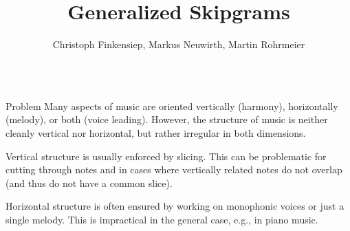 \documentclass[final,cmyk]{beamer}
\title{Generalized Skipgrams}
\author{Christoph Finkensiep, Markus Neuwirth, Martin Rohrmeier}
\institute{Digital and Cognitive Musicology Lab, École Polytechnique Fédérale de Lausanne}
\newcommand*{\pianoroll}{
  \draw (0,2) rectangle (1,2.4);
  \draw (1,2.4) rectangle (2,2.8);
  \draw (2,2) rectangle (2.5,2.4);
  \draw (2.5,1.6) rectangle (3,2);
  \draw (3,1.2) rectangle (3.5,1.6);
  \draw (3.5,0.8) rectangle (4,1.2);
  
  \draw (4,1.6) rectangle (5,2);
  \draw (5,2) rectangle (6,2.4);
  \draw (6,1.6) rectangle (6.5,2);
  \draw (6.5,1.2) rectangle (7,1.6);
  \draw (7,0.8) rectangle (7.5,1.2);
  \draw (7.5,0.4) rectangle (8,0.8);
  
  \draw (1,-0.4) rectangle (2,0);
  \draw (2,0) rectangle (4,0.4);
  \draw (5,-0.8) rectangle (6,-0.4);
  \draw (6,-0.4) rectangle (8,0);
}
\begin{document}
\begin{frame}[t]

  \begin{columns}[t]
    \begin{column}{0.3\textwidth}
      \begin{block}{Problem}
        Many aspects of music are oriented \alert{vertically}
        (harmony), \alert{horizontally} (melody), or both (voice
        leading).  However, the structure of music is neither cleanly
        vertical nor horizontal, but rather irregular in both
        dimensions.

        \begin{adjustbox}{scale=2.7,center,margin=0 1ex}
        \end{adjustbox}

        Vertical structure is usually enforced by \alert{slicing}.
        This can be problematic for cutting through notes and in cases
        where vertically related notes do not overlap (and thus do not
        have a common slice).

        \begin{adjustbox}{scale=2.7,center,margin=0 1ex}
        \end{adjustbox}

        Horizontal structure is often ensured by working on
        \alert{monophonic voices} or just a single \alert{melody}.
        This is impractical in the general case, e.g., in piano music.
        
        \begin{adjustbox}{scale=2.7,center,margin=0 1ex}
        \end{adjustbox}
        

\end{block}
\end{column}
\end{columns}
\end{frame}
\end{document}
